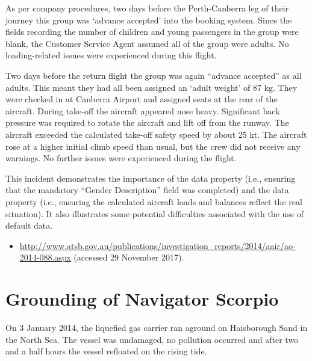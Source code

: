 As per company procedures, two days before the Perth-Canberra leg of their journey this group was `advance accepted' into the booking system. Since the fields recording the number of children and young passengers in the group were blank, the Customer Service Agent assumed all of the group were adults. No loading-related issues were experienced during this flight.

Two days before the return flight the group was again ``advance accepted'' as all adults. This meant they had all been assigned an `adult weight' of 87 kg. They were checked in at Canberra Airport and assigned seats at the rear of the aircraft. During take-off the aircraft appeared nose heavy. Significant back pressure was required to rotate the aircraft and lift off from the runway. The aircraft exceeded the calculated take-off safety speed by about 25 kt. The aircraft rose at a higher initial climb speed than usual, but the crew did not receive any warnings. No further issues were experienced during the flight.

This incident demonstrates the importance of the  data property (i.e., ensuring that the mandatory ``Gender Description'' field was completed) and the  \gls{data property} (i.e., ensuring the calculated aircraft loads and balances reflect the real situation). It also illustrates some potential difficulties associated with the use of default data.

\begin{samepage}
\begin{itemize}
  \item \raggedright{\href{http://www.atsb.gov.au/publications/investigation_reports/2014/aair/ao-2014-088.aspx}{http://www.atsb.gov.au/publications/investigation\_reports/2014/aair/ao-2014-088.aspx} (accessed 29 November 2017).}
\end{itemize}
\end{samepage}


\section{Grounding of Navigator Scorpio} \label{bkm:incacc:navscor}
On 3 January 2014, the liquefied gas carrier  ran aground on Haisborough Sand in the North Sea. The vessel was undamaged, no pollution occurred and after two and a half hours the vessel refloated on the rising tide.

